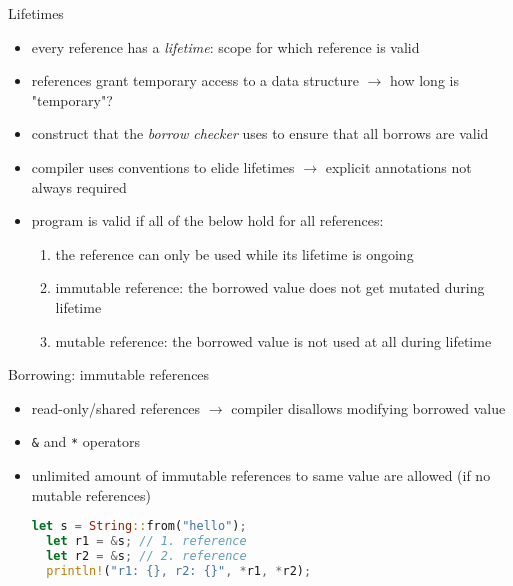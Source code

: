 \documentclass[handout]{beamer}
\begin{document}
\begin{frame}[fragile]{Lifetimes}
\begin{itemize}
  \item every reference has a \emph{lifetime}: scope for which reference is valid
  \item references grant temporary access to a data structure $\rightarrow$ how long is "temporary"?
  \item construct that the \emph{borrow checker} uses to ensure that all borrows are valid
  \item compiler uses conventions to elide lifetimes $\rightarrow$ explicit annotations not always required
  \item program is valid if all of the below hold for all references:
  \begin{enumerate}
    \item the reference can only be used while its lifetime is ongoing
    \item immutable reference: the borrowed value does not get mutated during lifetime
    \item mutable reference: the borrowed value is not used at all during lifetime
  \end{enumerate}
\end{itemize}
\end{frame}


\begin{frame}[fragile]{Borrowing: immutable references}
\begin{itemize}
  \item read-only/shared references $\rightarrow$ compiler disallows modifying borrowed value
  \item \verb|&| and \verb|*| operators
  \item unlimited amount of immutable references to same value are allowed (if no mutable references)

  \begin{lstlisting}[language=Rust]
  let s = String::from("hello");
  let r1 = &s; // 1. reference
  let r2 = &s; // 2. reference
  println!("r1: {}, r2: {}", *r1, *r2);
  \end{lstlisting}
\end{itemize}
\end{frame}
\end{document}
